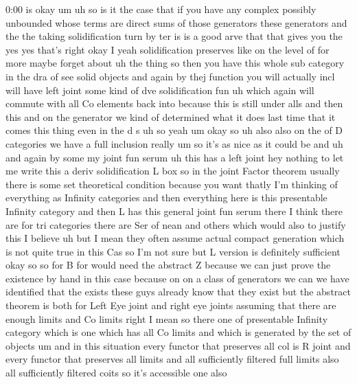 \begin{unfinished}{0:00}
is
okay
um
uh  so  is  it  the  case  that  if  you  have
any  complex  possibly  unbounded  whose
terms  are  direct  sums  of  those
generators  these  generators  and  the  the
taking  solidification  turn  by  ter  is  is
a  good  arve  that  that  gives  you  the
yes  yes  that's
right
okay  I  yeah  solidification  preserves
like  on  the  level
of  for  more  maybe  forget  about
uh  the  thing  so  then  you  have  this  whole
sub  category  in  the  dra  of  see  solid
objects  and  again  by  thej  function  you
will  actually  incl  will  have  left  joint
some  kind  of  dve  solidification
fun  uh  which  again  will  commute  with  all
Co  elements  back  into  because  this  is
still  under  alls  and  then  this  and  on
the  generator  we  kind  of  determined  what
it  does  last  time  that  it  comes  this
thing  even  in  the  d  s  uh  so
yeah  um
okay  so  uh  also  also  on  the  of  D
categories  we  have  a  full  inclusion
really  um  so  it's  as  nice  as  it  could  be
and  uh  and  again  by  some  my  joint  fun
serum  uh  this  has  a  left
joint  hey  nothing  to  let  me  write  this  a
deriv  solidification
L
box  so  in  the  joint  Factor  theorem
usually  there  is  some  set
theoretical  condition  because  you  want
thatly  I'm  thinking  of  everything  as
Infinity  categories  and  then  everything
here  is  this  presentable  Infinity
category  and  then  L  has  this  general
joint  fun  serum  there  I  think  there  are
for  tri  categories  there  are  Ser  of  nean
and  others  which  would  also  to  justify
this  I  believe  uh  but  I  mean  they  often
assume  actual  compact  generation  which
is  not  quite  true  in  this  Cas  so  I'm  not
sure  but  L  version  is  definitely
sufficient  okay  so  so  for  B  for  would
need  the  abstract  Z  because  we  can  just
prove  the  existence  by  hand  in  this  case
because  on  on  a  class  of  generators  we
can  we  have  identified  that  the  exists
these  guys  already  know  that  they  exist
but  the  abstract  theorem  is  both  for
Left  Eye  joint  and  right  eye  joints
assuming  that  there  are  enough  limits
and  Co  limits  right  I  mean  so  there  one
of  presentable  Infinity  category  which
is  one  which  has  all  Co  limits  and  which
is  generated  by  the  set  of  objects  um
and  in  this  situation  every  functor  that
preserves  all  col  is  R
joint  and  every  functor  that  preserves
all  limits  and  all  sufficiently  filtered
full
limits  also
all  sufficiently  filtered  coits  so  it's
accessible  one
also

\end{unfinished}
